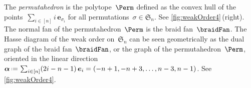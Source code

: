 \documentclass{amsart}
\theoremstyle{definition}
\newcommand{\f}[1]{{\mathfrak{#1}}} %
\renewcommand{\b}[1]{{\boldsymbol{#1}}} %
\newcommand{\eqdef}{\mbox{\,\raisebox{0.2ex}{\scriptsize\ensuremath{\mathrm:}}\ensuremath{=}\,}} %
\newcommand{\darkblue}{\color{darkblue}} %
\newcommand{\defn}[1]{\textsl{\darkblue #1}} %
\begin{document}
The \defn{permutahedron} is the polytope~$\Perm$ defined as the convex hull of the points~$\sum_{i \in [n]} i \, \b{e}_{\sigma_i}$ for all permutations~$\sigma \in \f{S}_n$.
See \cref{fig:weakOrder4}\,(right).
The normal fan of the permutahedron~$\Perm$ is the braid fan~$\braidFan$.
The Hasse diagram of the weak order on~$\f{S}_n$ can be seen geometrically as the dual graph of the braid fan~$\braidFan$, or the graph of the permutahedron~$\Perm$, oriented in the linear direction~$\b{\alpha} \eqdef \sum_{i \in [n]} (2i-n-1) \, \b{e}_i = (-n+1, -n+3, \dots, n-3, n-1)$.
See \cref{fig:weakOrder4}.

\begin{figure}
	\capstart
\end{figure}
\end{document}
